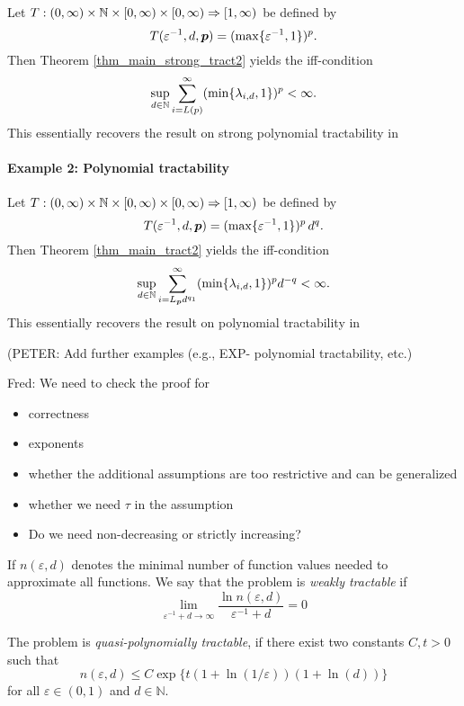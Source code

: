 \documentclass[11pt,a4paper]{article}
\newcommand{\fred}[1]{\begingroup\color{blue}Fred: #1\endgroup}
\newcommand{\peter}[1]{\begingroup\color{purple}#1\endgroup}
\begin{document}
Let $T: (0,\infty) \times \mathbb{N} \times [0,\infty) \times [0,\infty)\Rightarrow [1,\infty)$
be defined by
\[
 T(\varepsilon^{-1},d,\boldsymbol{p})= (\max\{\varepsilon^{-1},1\})^p .
\]
Then Theorem \ref{thm_main_strong_tract2} yields the iff-condition
\[
 \sup_{d\in\mathbb{N}} \sum_{i=L(p)}^\infty (\min\{\lambda_{i,d},1\})^p < \infty.
\]
This essentially recovers the result on strong polynomial tractability in \cite[Theorem 5.1]{NW08}

\paragraph{Example 2: Polynomial tractability}

Let $T: (0,\infty) \times \mathbb{N} \times [0,\infty) \times [0,\infty)\Rightarrow [1,\infty)$
be defined by
\[
 T(\varepsilon^{-1},d,\boldsymbol{p})= (\max\{\varepsilon^{-1},1\})^p\, d^q.
\]
Then Theorem \ref{thm_main_tract2} yields the iff-condition
\[
 \sup_{d\in\mathbb{N}} \sum_{i=L_{\boldsymbol{p}} d^{q_1}}^\infty (\min\{\lambda_{i,d},1\})^p d^{-q} < \infty.
\]
This essentially recovers the result on polynomial tractability in \cite[Theorem 5.1]{NW08}



\peter{(PETER: Add further examples (e.g., EXP- polynomial tractability, etc.)}

\bigskip

\fred{We need to check the proof for
\begin{itemize}
\item correctness
\item exponents
\item whether the additional assumptions are too restrictive and can be generalized
\item whether we need $\tau$ in the assumption
\item Do we need non-decreasing or strictly increasing?
\end{itemize}}
\begin{definition}
If $n(\varepsilon,d)$ denotes the minimal number of function values needed to approximate all functions. We say that the problem is \emph{weakly tractable} if
    \[\lim_{\varepsilon^{-1}+d\rightarrow \infty} \frac{\ln n(\varepsilon,d)}{\varepsilon^{-1}+d} = 0\]
\end{definition}
\begin{definition}
    The problem is \emph{quasi-polynomially tractable}, if there exist two constants $C, t> 0$ such that
    \[
    n(\varepsilon,d) \leq C\exp\{t(1+\ln(1/\varepsilon))(1+\ln(d))\}
    \] for all $\varepsilon \in (0,1)$ and $d\in\mathbb{N}$.
\end{definition}
\end{document}
